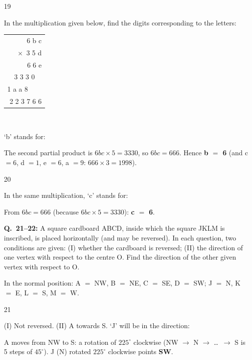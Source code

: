 \begin{question}{19}
{In the multiplication given below, find the digits corresponding to the letters:\\[3pt]
\centering\begin{tabular}{r} 6 b c\\ $\times$\ 3 5 d\\\hline 6 6 e\\ 3 3 3 0\ \ \\ 1 a a 8\ \ \ \ \\\hline 2 2 3 7 6 6\end{tabular}\\[3pt]
\raggedright `b' stands for:\par}
\begin{explain}
The second partial product is $6bc\times5=3330$, so $6bc=666$. Hence \textbf{b $=$ 6} (and c $=6$, d $=1$, e $=6$, a $=9$: $666\times3=1998$).
\end{explain}
\end{question}

\begin{question}{20}
{In the same multiplication, `c' stands for:\par}
\begin{explain}
From $6bc=666$ (because $6bc\times5=3330$): \textbf{c $=$ 6}.
\end{explain}
\end{question}

\begin{context}
\textbf{Q.~21--22:} A square cardboard ABCD, inside which the square JKLM is inscribed, is placed horizontally (and may be reversed). In each question, two conditions are given: (I) whether the cardboard is reversed; (II) the direction of one vertex with respect to the centre O. Find the direction of the other given vertex with respect to O.
\begin{center}
\end{center}
In the normal position: A $=$ NW, B $=$ NE, C $=$ SE, D $=$ SW; J $=$ N, K $=$ E, L $=$ S, M $=$ W.
\end{context}
\begin{question}{21}
{(I) Not reversed. (II) A towards S. `J' will be in the direction:\par}
\begin{explain}
A moves from NW to S: a rotation of $225^\circ$ clockwise (NW $\rightarrow$ N $\rightarrow$ \ldots\ $\rightarrow$ S is 5 steps of $45^\circ$). J (N) rotated $225^\circ$ clockwise points \textbf{SW}.
\end{explain}
\end{question}

